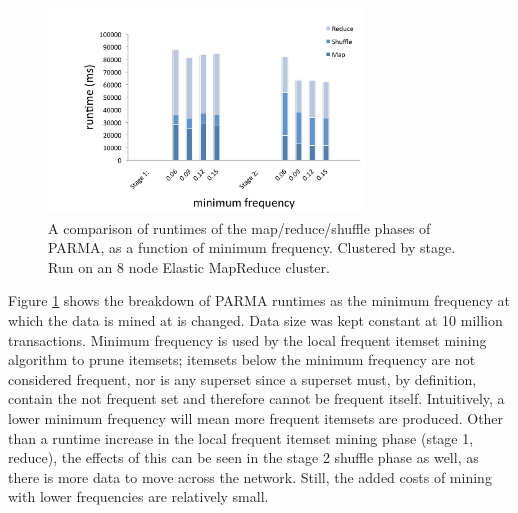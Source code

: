 \begin{figure}[htb]
  \centering
    \includegraphics[width=0.75\textwidth]{parma/frequency}
  \caption{A comparison of runtimes of the map/reduce/shuffle phases
of PARMA, as a function of minimum frequency. Clustered by stage. Run
on an 8 node Elastic MapReduce cluster.}
\label{fig:parmafrequency}
\end{figure}

Figure \ref{fig:parmafrequency} shows the breakdown of PARMA runtimes as
the minimum frequency at which the data is mined at is changed. Data
size was kept constant at 10 million transactions. Minimum frequency
is used by the local frequent itemset mining algorithm to prune
itemsets; itemsets below the minimum frequency are not considered
frequent, nor is any superset since a superset must, by definition,
contain the not frequent set and therefore cannot be frequent
itself. Intuitively, a lower minimum frequency will mean more frequent
itemsets are produced. Other than a runtime increase in the local
frequent itemset mining phase (stage 1, reduce), the effects of this
can be seen in the stage 2 shuffle phase as well, as there is more
data to move across the network. Still, the added costs of mining with
lower frequencies are relatively small.

